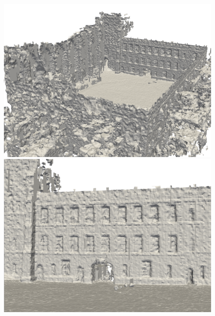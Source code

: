 \begin{figure}[htbp]
    \centering
    \begin{minipage}{0.5\linewidth}
    \centering
    \includegraphics[width=1\linewidth]{figures/ncd_3_shine.png}
    \end{minipage}\hfill
    \begin{minipage}{0.5\linewidth}
    \centering
    \includegraphics[width=1\linewidth]{figures/ncd_2_shine.png}
    \end{minipage}
    \vfill
    \begin{minipage}{0.5\linewidth}
        \centering

\end{minipage}
\end{figure}
